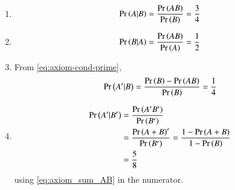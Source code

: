 \begin{enumerate}
\item
\begin{equation}
\Pr\left(A|B\right)= \frac{\Pr\left(AB\right)}{\Pr\left(B\right)}= \frac{3}{4}
\end{equation}
\item
\begin{equation}
\Pr\left(B|A\right)= \frac{\Pr\left(AB\right)}{\Pr\left(A\right)}= \frac{1}{2}
\end{equation}
\item From 
\eqref{eq:axiom-cond-prime},
\begin{align}
\Pr\left(A^{\prime}|B\right)= \frac{\Pr\left(B\right)-\Pr\left(AB\right)}{\Pr\left(B\right)}
= \frac{1}{4}
\end{align}
\item
\begin{align}
\Pr\left(A^{\prime}|B^{\prime}\right)&= \frac{\Pr\left(A^{\prime} B^{\prime}\right)}{\Pr\left(B^{\prime}\right)}\\
&=\frac{\Pr\left(A + B\right)^{\prime}}{\Pr\left(B^{\prime}\right)}
=\frac{1- \Pr\left(A + B\right)}{1-\Pr\left(B\right)}
\\
&= \frac{5}{8} 
\end{align}
using 
\eqref{eq:axiom_sum_AB} in the numerator.
\end{enumerate}

